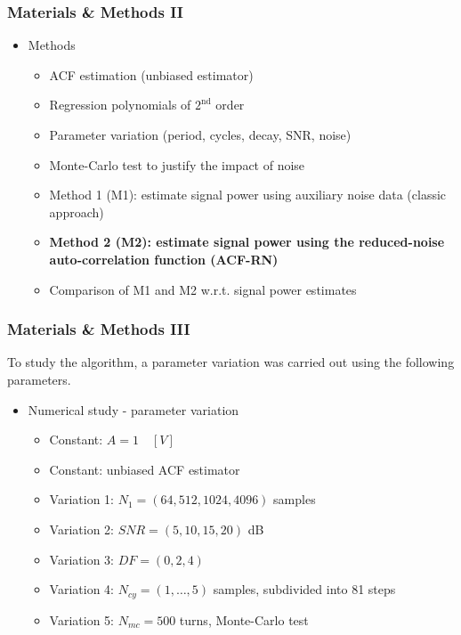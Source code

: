 \documentclass[11pt,aspectratio=169]{beamer}
\begin{document}
	\begin{frame}
		\frametitle{Materials \& Methods II}
		\begin{itemize}
			\setlength\itemsep{0.5em}
			\item \textcolor{RIPtitlecol}{Methods}
			\begin{itemize}
				\setlength\itemsep{0.5em}
				\item ACF estimation (unbiased estimator)
				\item Regression polynomials of $2^{\text{nd}}$ order
				\item Parameter variation (period, cycles, decay, SNR, noise)
				\item Monte-Carlo test to justify the impact of noise
				\item Method 1 (M1): estimate signal power using auxiliary noise data (classic approach)
				\item \textbf{Method 2 (M2): estimate signal power using the reduced-noise auto-correlation function (ACF-RN)}
				\item Comparison of M1 and M2 w.r.t. signal power estimates
			\end{itemize}
		\end{itemize}
	\end{frame}
	\begin{frame}
		\frametitle{Materials \& Methods III}
		To study the algorithm, a parameter variation was carried out using the following parameters.
		\begin{itemize}
			\setlength\itemsep{0.5em}
			\item \textcolor{RIPtitlecol}{Numerical study - parameter variation}
			\begin{itemize}
				\setlength\itemsep{0.5em}
				\item Constant: $A = 1 \quad [V]$
				\item Constant: unbiased ACF estimator
				\item Variation 1: $N_1 = (64, 512, 1024, 4096)$ samples
				\item Variation 2: $SNR = (5, 10, 15, 20)$ dB
				\item Variation 3: $DF = (0, 2, 4)$
				\item Variation 4: $N_{cy} = (1,\ldots,5)$ samples, subdivided into 81 steps
				\item Variation 5: $N_{mc} = 500$ turns, Monte-Carlo test
			\end{itemize}
		\end{itemize}
	\end{frame}
\end{document}
